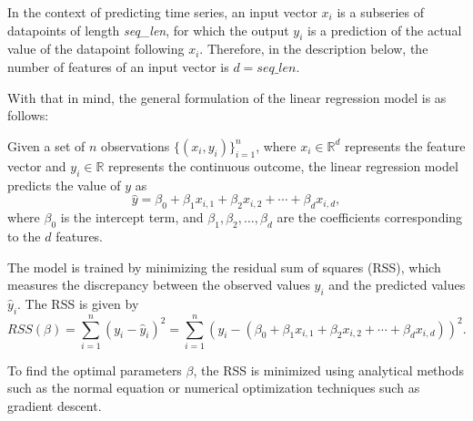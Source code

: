 In the context of predicting time series, an input vector \(x_i\) is a subseries of datapoints of length \textit{seq\_len}, for which the output \(y_i\) is a prediction of the actual value of the datapoint following \(x_i\). Therefore, in the description below, the number of features of an input vector is \(d = \textit{seq\_len}\).

With that in mind, the general formulation of the linear regression model is as follows:

Given a set of \(n\) observations \(\{(x_i, y_i)\}_{i=1}^n\), where \(x_i \in \mathbb{R}^d\) represents the feature vector and \(y_i \in \mathbb{R}\) represents the continuous outcome, the linear regression model predicts the value of \(y\) as
\[
	\hat{y} = \beta_0 + \beta_1 x_{i,1} + \beta_2 x_{i,2} + \cdots + \beta_d x_{i,d},
\]
where \(\beta_0\) is the intercept term, and \(\beta_1, \beta_2, \ldots, \beta_d\) are the coefficients corresponding to the \(d\) features.

The model is trained by minimizing the residual sum of squares (RSS), which measures the discrepancy between the observed values \(y_i\) and the predicted values \(\hat{y}_i\). The RSS is given by
\[
	RSS(\beta) = \sum_{i=1}^n (y_i - \hat{y}_i)^2 = \sum_{i=1}^n \left(y_i - (\beta_0 + \beta_1 x_{i,1} + \beta_2 x_{i,2} + \cdots + \beta_d x_{i,d})\right)^2.
\]

To find the optimal parameters \(\beta\), the RSS is minimized using analytical methods such as the normal equation or numerical optimization techniques such as gradient descent.








